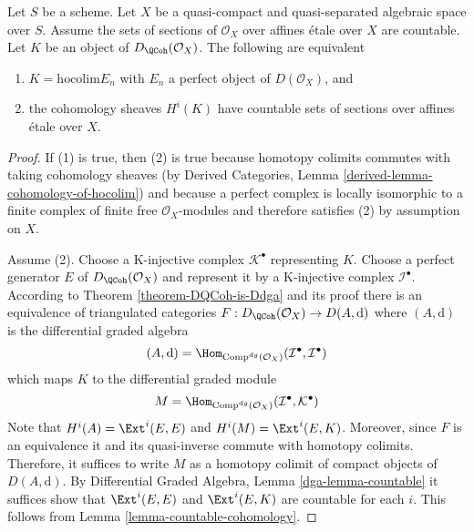 \begin{lemma}
\label{lemma-countable}
Let $S$ be a scheme.
Let $X$ be a quasi-compact and quasi-separated algebraic space over $S$.
Assume the sets of sections of $\mathcal{O}_X$ over affines \'etale over $X$
are countable. Let $K$ be an object of $D_\QCoh(\mathcal{O}_X)$. The
following are equivalent
\begin{enumerate}
\item $K = \text{hocolim} E_n$ with $E_n$ a perfect object of
$D(\mathcal{O}_X)$, and
\item the cohomology sheaves $H^i(K)$ have countable
sets of sections over affines \'etale over $X$.
\end{enumerate}
\end{lemma}

\begin{proof}
If (1) is true, then (2) is true because homotopy colimits commutes
with taking cohomology sheaves
(by Derived Categories, Lemma \ref{derived-lemma-cohomology-of-hocolim})
and because a perfect complex is
locally isomorphic to a finite complex of finite free $\mathcal{O}_X$-modules
and therefore satisfies (2) by assumption on $X$.

\medskip\noindent
Assume (2).
Choose a K-injective complex $\mathcal{K}^\bullet$ representing $K$.
Choose a perfect generator $E$ of $D_\QCoh(\mathcal{O}_X)$ and
represent it by a K-injective complex $\mathcal{I}^\bullet$.
According to Theorem \ref{theorem-DQCoh-is-Ddga}
and its proof there is an equivalence
of triangulated categories $F : D_\QCoh(\mathcal{O}_X) \to D(A, \text{d})$
where $(A, \text{d})$ is the differential graded algebra
$$
(A, \text{d}) =
\Hom_{\text{Comp}^{dg}(\mathcal{O}_X)}
(\mathcal{I}^\bullet, \mathcal{I}^\bullet)
$$
which maps $K$ to the differential graded module
$$
M = \Hom_{\text{Comp}^{dg}(\mathcal{O}_X)}
(\mathcal{I}^\bullet, \mathcal{K}^\bullet)
$$
Note that $H^i(A) = \Ext^i(E, E)$ and
$H^i(M) = \Ext^i(E, K)$.
Moreover, since $F$ is an equivalence it and its quasi-inverse commute
with homotopy colimits.
Therefore, it suffices to write $M$ as a homotopy colimit
of compact objects of $D(A, \text{d})$.
By Differential Graded Algebra, Lemma \ref{dga-lemma-countable}
it suffices show that $\Ext^i(E, E)$ and
$\Ext^i(E, K)$ are countable for each $i$.
This follows from Lemma \ref{lemma-countable-cohomology}.
\end{proof}

